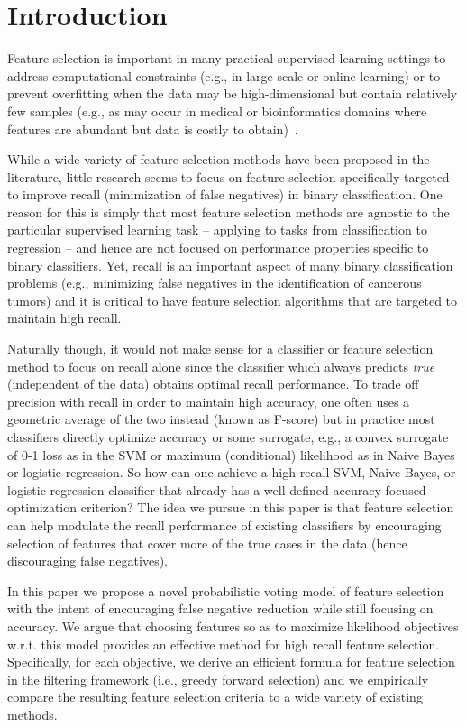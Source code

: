 \section{Introduction}

Feature selection is important in many practical supervised learning
settings to address computational constraints (e.g., in large-scale or
online learning) or to prevent overfitting when the data may be
high-dimensional but contain relatively few samples (e.g., as may
occur in medical or bioinformatics domains where features are abundant
but data is costly to obtain)~\cite{guyon_jmlr03}.

While a wide variety of feature selection methods have been proposed
in the literature, little research seems to focus on feature selection
specifically targeted to improve recall (minimization of false
negatives) in binary classification.  One reason for this is simply
that most feature selection methods are agnostic to the particular
supervised learning task -- applying to tasks from classification to
regression -- and hence are not focused on performance properties
specific to binary classifiers.  Yet, recall is an important aspect of
many binary classification problems (e.g., minimizing false negatives
in the identification of cancerous tumors) and it is critical to have
feature selection algorithms that are targeted to maintain high recall.

Naturally though, it would not make sense for a classifier or feature
selection method to focus on recall alone since the classifier which
always predicts \emph{true} (independent of the data) obtains optimal
recall performance.  To trade off precision with recall in order to
maintain high accuracy, one often uses a geometric average of the two
instead (known as F-score) but in practice most classifiers directly
optimize accuracy or some surrogate, e.g., a convex surrogate of 0-1
loss as in the SVM or maximum (conditional) likelihood as in Naive
Bayes or logistic regression.  So how can one achieve a high recall
SVM, Naive Bayes, or logistic regression classifier that already has a
well-defined accuracy-focused optimization criterion?  The idea we
pursue in this paper is that feature selection can help modulate the
recall performance of existing classifiers by encouraging selection of
features that cover more of the true cases in the data (hence
discouraging false negatives).

In this paper we propose a novel probabilistic voting model of feature
selection with the intent of encouraging false negative reduction
while still focusing on accuracy.  We argue that choosing features so
as to maximize likelihood objectives w.r.t. this model provides an
effective method for high recall feature selection.  Specifically, for
each objective, we derive an efficient formula for feature selection
in the filtering framework (i.e., greedy forward selection) and we
empirically compare the resulting feature selection criteria to a wide
variety of existing methods.

